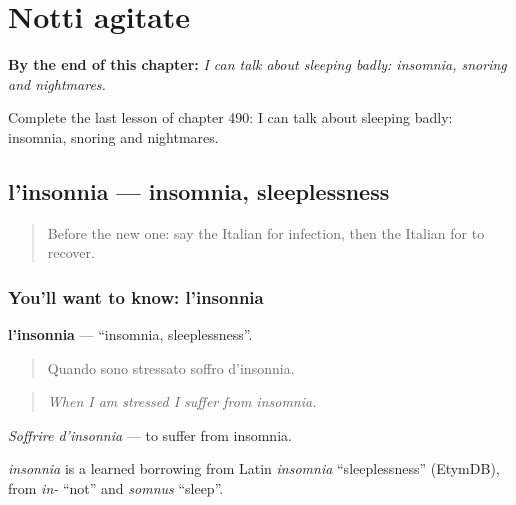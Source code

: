 
\chapter{Notti agitate}
\label{ch:it-notti-agitate}

\begin{chapteropening}
\textbf{By the end of this chapter:} \emph{I can talk about sleeping badly: insomnia, snoring and nightmares.}

Complete the last lesson of chapter 490: I can talk about sleeping badly: insomnia, snoring and nightmares.
\end{chapteropening}

\section[l'insonnia]{l'insonnia — insomnia, sleeplessness}

\label{lesson:IT-C490-insonnia}



\begin{quote}
Before the new one: say the Italian for infection, then the Italian for to recover.
\end{quote}

\subsection*{You'll want to know: l'insonnia}
\textbf{l'insonnia} — \textquotedblleft{}insomnia, sleeplessness\textquotedblright{}.

\begin{quote}
Quando sono stressato soffro d'insonnia.
\end{quote}

\begin{quote}
\emph{When I am stressed I suffer from insomnia.}
\end{quote}

\emph{Soffrire d'insonnia} — to suffer from insomnia.

\begin{cousinweb}
\emph{insonnia} is a learned borrowing from Latin \emph{insomnia} \textquotedblleft{}sleeplessness\textquotedblright{} (EtymDB), from \emph{in-} \textquotedblleft{}not\textquotedblright{} and \emph{somnus} \textquotedblleft{}sleep\textquotedblright{}.
\end{cousinweb}

